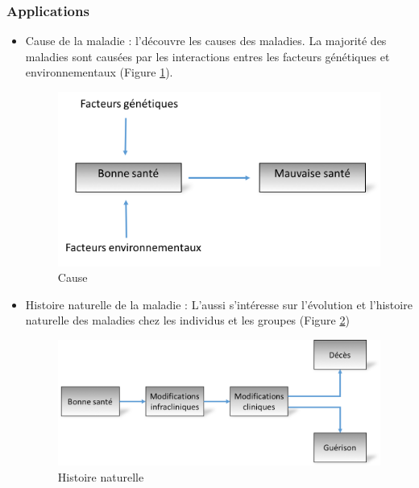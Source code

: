 \subsubsection{Applications}
\begin {itemize}
	\item{Cause de la maladie : l'\ep découvre les causes des maladies. La majorité des maladies sont causées par les interactions entres les facteurs génétiques et environnementaux (Figure \ref{Pic1}).
\begin{figure}[h]
\includegraphics[width = \linewidth]{../figures/chap1/Pic1.png}
\caption{Cause}
\label{Pic1}	
\end{figure}
}

\item{Histoire naturelle de la maladie : L'\ep aussi s'intéresse sur l'évolution et l'histoire naturelle des maladies chez les individus et les groupes (Figure \ref{Pic2})
\begin{figure}[h]
\includegraphics[width = \linewidth]{../figures/chap1/Pic2.png}
\caption{Histoire naturelle}
\label{Pic2}	
\end{figure}
}


\end{itemize}

